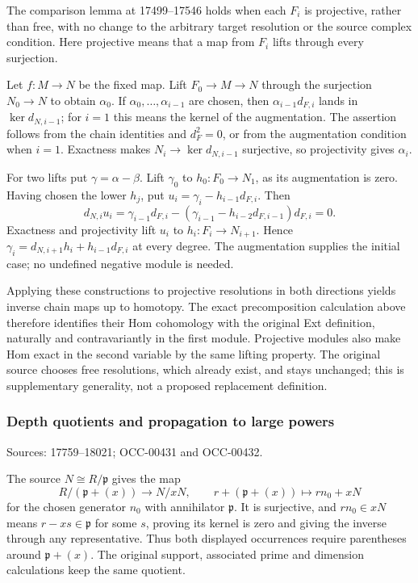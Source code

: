 The comparison lemma at 17499--17546 holds when each \(F_i\) is projective, rather than free, with no change to the arbitrary target resolution or the source complex condition. Here projective means that a map from \(F_i\) lifts through every surjection.

Let \(f:M\to N\) be the fixed map. Lift \(F_0\to M\to N\) through the surjection \(N_0\to N\) to obtain \(\alpha_0\). If \(\alpha_0,\ldots,\alpha_{i-1}\) are chosen, then \(\alpha_{i-1}d_{F,i}\) lands in \(\ker d_{N,i-1}\); for \(i=1\) this means the kernel of the augmentation. The assertion follows from the chain identities and \(d_F^2=0\), or from the augmentation condition when \(i=1\). Exactness makes \(N_i\to\ker d_{N,i-1}\) surjective, so projectivity gives \(\alpha_i\).

For two lifts put \(\gamma=\alpha-\beta\). Lift \(\gamma_0\) to \(h_0:F_0\to N_1\), as its augmentation is zero. Having chosen the lower \(h_j\), put \(u_i=\gamma_i-h_{i-1}d_{F,i}\). Then \[
d_{N,i}u_i
=\gamma_{i-1}d_{F,i}
-(\gamma_{i-1}-h_{i-2}d_{F,i-1})d_{F,i}=0.
\] Exactness and projectivity lift \(u_i\) to \(h_i:F_i\to N_{i+1}\). Hence \(\gamma_i=d_{N,i+1}h_i+h_{i-1}d_{F,i}\) at every degree. The augmentation supplies the initial case; no undefined negative module is needed.

Applying these constructions to projective resolutions in both directions yields inverse chain maps up to homotopy. The exact precomposition calculation above therefore identifies their Hom cohomology with the original Ext definition, naturally and contravariantly in the first module. Projective modules also make Hom exact in the second variable by the same lifting property. The original source chooses free resolutions, which already exist, and stays unchanged; this is supplementary generality, not a proposed replacement definition.

\subsubsection{Depth quotients and propagation to large powers}\label{algebra-proof-007-depth-quotients-and-propagation-to-large-powers}

Sources: 17759--18021; OCC-00431 and OCC-00432.

The source \(N\cong R/\mathfrak p\) gives the map \[
R/(\mathfrak p+(x))\longrightarrow N/xN,\qquad
r+(\mathfrak p+(x))\longmapsto r n_0+xN
\] for the chosen generator \(n_0\) with annihilator \(\mathfrak p\). It is surjective, and \(rn_0\in xN\) means \(r-xs\in\mathfrak p\) for some \(s\), proving its kernel is zero and giving the inverse through any representative. Thus both displayed occurrences require parentheses around \(\mathfrak p+(x)\). The original support, associated prime and dimension calculations keep the same quotient.

